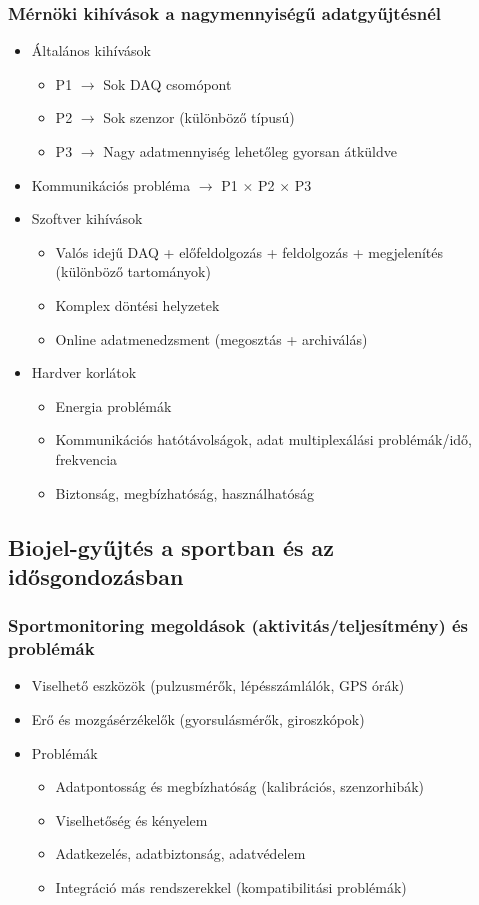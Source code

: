 \subsubsection{Mérnöki kihívások a nagymennyiségű adatgyűjtésnél}
\begin{itemize}
    \item Általános kihívások
    \begin{itemize}
        \item P1 $\rightarrow$ Sok DAQ csomópont
        \item P2 $\rightarrow$ Sok szenzor (különböző típusú)
        \item P3 $\rightarrow$ Nagy adatmennyiség lehetőleg gyorsan átküldve
    \end{itemize}
    \item Kommunikációs probléma $\rightarrow$ P1 $\times$ P2 $\times$ P3
    \item Szoftver kihívások
    \begin{itemize}
        \item Valós idejű DAQ + előfeldolgozás + feldolgozás + megjelenítés (különböző tartományok)
        \item Komplex döntési helyzetek
        \item Online adatmenedzsment (megosztás + archiválás)
    \end{itemize}
    \item Hardver korlátok
    \begin{itemize}
        \item Energia problémák
        \item Kommunikációs hatótávolságok, adat multiplexálási problémák/idő, frekvencia
        \item Biztonság, megbízhatóság, használhatóság
    \end{itemize}
\end{itemize}

\clearpage
\subsection{Biojel-gyűjtés a sportban és az idősgondozásban}
\subsubsection{Sportmonitoring megoldások (aktivitás/teljesítmény) és problémák}
\begin{itemize}
    \item Viselhető eszközök (pulzusmérők, lépésszámlálók, GPS órák)
    \item Erő és mozgásérzékelők (gyorsulásmérők, giroszkópok)
    \item Problémák
    \begin{itemize}
        \item Adatpontosság és megbízhatóság (kalibrációs, szenzorhibák)
        \item Viselhetőség és kényelem
        \item Adatkezelés, adatbiztonság, adatvédelem
        \item Integráció más rendszerekkel (kompatibilitási problémák)
    \end{itemize}
\end{itemize}

